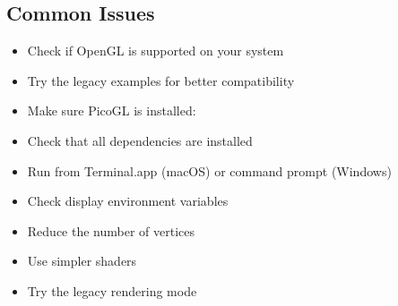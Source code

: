 \documentclass[a4paper,10pt,english,openany,oneside]{sphinxmanual}
\begin{document}
\subsection{Common Issues}
\label{\detokenize{quickstart:common-issues}}\begin{description}
\begin{itemize}
\item {} 
\sphinxAtStartPar
Check if OpenGL is supported on your system

\item {} 
\sphinxAtStartPar
Try the legacy examples for better compatibility

\end{itemize}

\begin{itemize}
\item {} 
\sphinxAtStartPar
Make sure PicoGL is installed: 

\item {} 
\sphinxAtStartPar
Check that all dependencies are installed

\end{itemize}

\begin{itemize}
\item {} 
\sphinxAtStartPar
Run from Terminal.app (macOS) or command prompt (Windows)

\item {} 
\sphinxAtStartPar
Check display environment variables

\end{itemize}

\begin{itemize}
\item {} 
\sphinxAtStartPar
Reduce the number of vertices

\item {} 
\sphinxAtStartPar
Use simpler shaders

\item {} 
\sphinxAtStartPar
Try the legacy rendering mode

\end{itemize}

\end{description}
\end{document}
